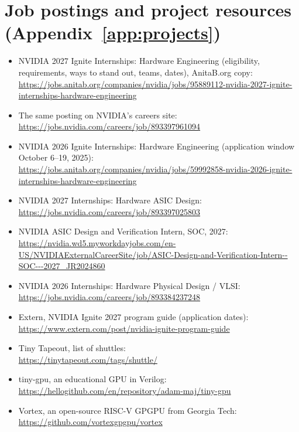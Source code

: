 \section*{Job postings and project resources (Appendix~\ref{app:projects})}
\begin{itemize}\small
  \item NVIDIA 2027 Ignite Internships: Hardware Engineering (eligibility, requirements, ways to stand out, teams, dates), AnitaB.org copy:\\ \url{https://jobs.anitab.org/companies/nvidia/jobs/95889112-nvidia-2027-ignite-internships-hardware-engineering}
  \item The same posting on NVIDIA's careers site:\\ \url{https://jobs.nvidia.com/careers/job/893397961094}
  \item NVIDIA 2026 Ignite Internships: Hardware Engineering (application window October 6--19, 2025):\\ \url{https://jobs.anitab.org/companies/nvidia/jobs/59992858-nvidia-2026-ignite-internships-hardware-engineering}
  \item NVIDIA 2027 Internships: Hardware ASIC Design:\\ \url{https://jobs.nvidia.com/careers/job/893397025803}
  \item NVIDIA ASIC Design and Verification Intern, SOC, 2027:\\ \url{https://nvidia.wd5.myworkdayjobs.com/en-US/NVIDIAExternalCareerSite/job/ASIC-Design-and-Verification-Intern--SOC---2027_JR2024860}
  \item NVIDIA 2026 Internships: Hardware Physical Design / VLSI:\\ \url{https://jobs.nvidia.com/careers/job/893384237248}
  \item Extern, NVIDIA Ignite 2027 program guide (application dates):\\ \url{https://www.extern.com/post/nvidia-ignite-program-guide}
  \item Tiny Tapeout, list of shuttles:\\ \url{https://tinytapeout.com/tags/shuttle/}
  \item tiny-gpu, an educational GPU in Verilog:\\ \url{https://hellogithub.com/en/repository/adam-maj/tiny-gpu}
  \item Vortex, an open-source RISC-V GPGPU from Georgia Tech:\\ \url{https://github.com/vortexgpgpu/vortex}
\end{itemize}
